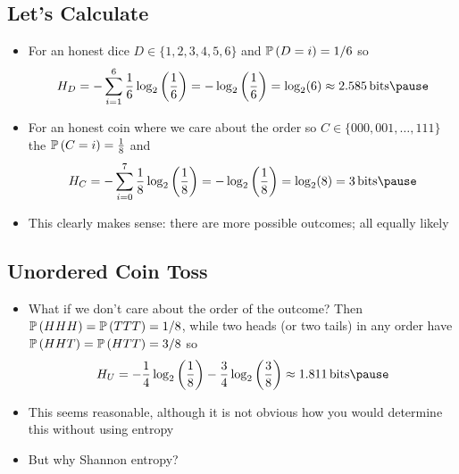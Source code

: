 
\begin{slide}
\section{Let's Calculate}

\begin{PauseHighLight}
  \begin{itemize}
  \item For an honest dice $D \in\{1,2,3,4,5,6\}$ and $\mathbb{P}\left( D=i \right) = 1/6$
    so
    \begin{align*}
      H_D = - \sum_{i=1}^6 \frac{1}{6} \logtwo{ \frac{1}{6}} = - \logtwo{
      \frac{1}{6}} = \log_2(6) \approx 2.585 \bits\pause
    \end{align*}
  \item For an honest coin where we care about the order so $C \in
    \{000,001,\ldots, 111\}$ the $\mathbb{P}\left( C=i \right) = \frac{1}{8}$ and
    \begin{align*}
      H_C = - \sum_{i=0}^7 \frac{1}{8} \logtwo{ \frac{1}{8}} = - \logtwo{
      \frac{1}{8}} = \log_2(8) = 3 \bits\pause
    \end{align*}
  \item This clearly makes sense: there are more possible outcomes; all
    equally likely\pause
  \end{itemize}
\end{PauseHighLight}


\end{slide}


\begin{slide}
\section{Unordered Coin Toss}

\begin{PauseHighLight}
  \begin{itemize}
  \item What if we don't care about the order of the outcome?  Then
    $\mathbb{P}\left( HHH \right)=\mathbb{P}\left( TTT \right)=1/8$, while two heads (or two tails) in any
    order have $\mathbb{P}\left( HHT \right)=\mathbb{P}\left( HTT \right)=3/8$ so
    \begin{align*}
      H_U = -\frac{1}{4} \logtwo{\frac{1}{8}} - \frac{3}{4}
      \logtwo{\frac{3}{8}}\approx 1.811 \bits\pause
    \end{align*}
  \item This seems reasonable, although it is not obvious how you
    would determine this without using entropy\pause
  \item But why Shannon entropy?\pauseb
  \end{itemize}
\end{PauseHighLight}

\end{slide}

